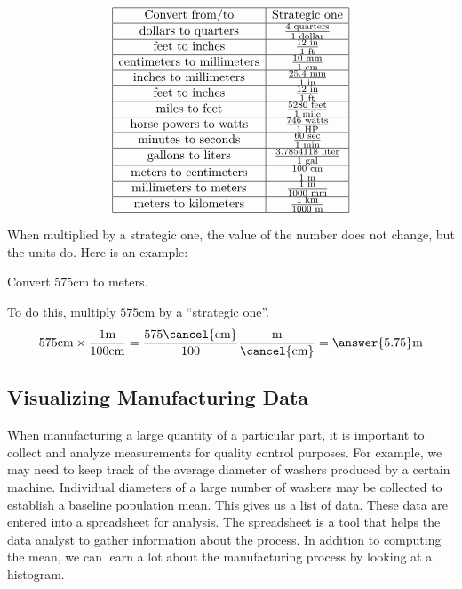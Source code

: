 \documentclass{ximera}
\begin{document}
$$\begin{array}{|c|c|} 
 \hline 
 \text{Convert from/to}&\text{Strategic one}\\ \hline 
\text{dollars to quarters}&\frac{4\text{ quarters}}{1\text{ dollar}}\\ \hline
\text{feet to inches}&\frac{12\text{ in}}{1\text{ ft}}\\ \hline
\text{centimeters to millimeters}&\frac{10\text{ mm}}{1\text{ cm}}\\
  \hline 
\text{inches to millimeters}&\frac{25.4\text{ mm}}{1\text{ in}}\\ \hline
\text{feet to inches}&\frac{12\text{ in}}{1\text{ ft}}\\ \hline
\text{miles to feet}&\frac{5280\text{ feet}}{1\text{ mile}}\\ \hline
\text{horse powers to watts}&\frac{746\text{ watts}}{1\text{ HP}}\\ \hline
\text{minutes to seconds}&\frac{60\text{ sec}}{1\text{ min}}\\ \hline
\text{gallons to liters}&\frac{3.7854118\text{ liter}}{1\text{ gal}}\\ \hline
\text{meters to centimeters}&\frac{100\text{ cm}}{1\text{ m}}\\ \hline
\text{millimeters to meters}&\frac{1\text{ m}}{1000\text{ mm}}\\ \hline
\text{meters to kilometers}&\frac{1\text{ km}}{1000\text{ m}}\\ \hline
 \end{array}$$

When multiplied by a strategic one, the value of the number does not change, but the units do. Here is an example:

 \begin{example}\label{ex:unitConversion}
     Convert $575$cm to meters. 
     \begin{explanation}
     To do this, multiply $575$cm by a “strategic one”.  
$$575\text{cm}\times \frac{1\text{m}}{100\text{cm}}=\frac{575\cancel{\text{cm}}}{100}\frac{\text{m}}{\cancel{\text{cm}}}=\answer{5.75}\text{m}$$
     \end{explanation}
 \end{example}

\subsection*{Visualizing Manufacturing Data}

When manufacturing a large quantity of a particular part, it is important to collect and analyze measurements for quality control purposes.  For example, we may need to keep track of the average diameter of washers produced by a certain machine.  Individual diameters of a large number of washers may be collected to establish a baseline population mean.  This gives us a list of data.  These data are entered into a spreadsheet for analysis. The spreadsheet is a tool that helps the data analyst to gather information about the process. In addition to computing the mean, we can learn a lot about the manufacturing process by looking at a histogram.  
\end{document}
